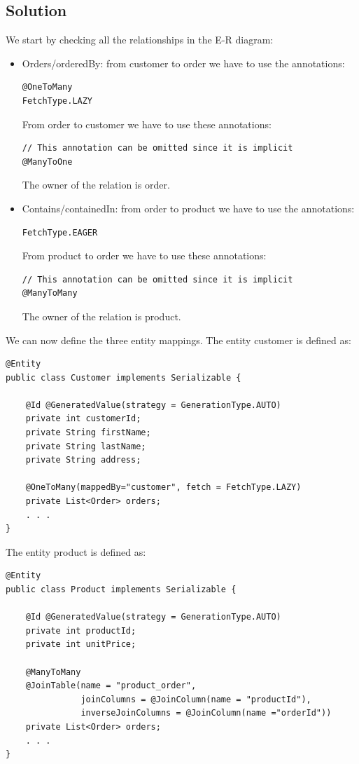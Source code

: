 \subsection*{Solution}
We start by checking all the relationships in the E-R diagram: 
\begin{itemize}
    \item Orders/orderedBy: from customer to order we have to use the annotations: 
        \begin{lstlisting}[style=Java]
@OneToMany
FetchType.LAZY
        \end{lstlisting}
        From order to customer we have to use these annotations: 
        \begin{lstlisting}[style=Java]
// This annotation can be omitted since it is implicit
@ManyToOne
        \end{lstlisting}
        The owner of the relation is order. 
    \item Contains/containedIn: from order to product we have to use the annotations: 
        \begin{lstlisting}[style=Java]
FetchType.EAGER
        \end{lstlisting}
        From product to order we have to use these annotations: 
        \begin{lstlisting}[style=Java]
// This annotation can be omitted since it is implicit
@ManyToMany
        \end{lstlisting}
        The owner of the relation is product. 
\end{itemize}
We can now define the three entity mappings. 
The entity customer is defined as:  
\begin{lstlisting}[style=Java]
@Entity
public class Customer implements Serializable {

    @Id @GeneratedValue(strategy = GenerationType.AUTO)
    private int customerId;
    private String firstName;
    private String lastName;
    private String address;

    @OneToMany(mappedBy="customer", fetch = FetchType.LAZY)
    private List<Order> orders;
    . . .
}
\end{lstlisting}
The entity product is defined as:  
\begin{lstlisting}[style=Java]
@Entity
public class Product implements Serializable {

    @Id @GeneratedValue(strategy = GenerationType.AUTO)
    private int productId;
    private int unitPrice;

    @ManyToMany
    @JoinTable(name = "product_order",
               joinColumns = @JoinColumn(name = "productId"),
               inverseJoinColumns = @JoinColumn(name ="orderId"))
    private List<Order> orders; 
    . . .
}
\end{lstlisting}
